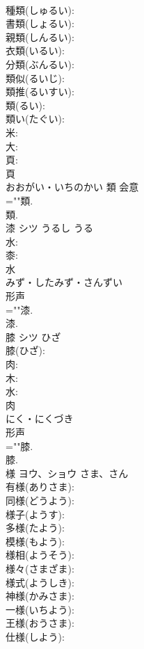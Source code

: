 \documentclass[8pt]{extreport}
\begin{document}
\begin{CJK}{UTF8}{min}
\\	種類(しゅるい): 
\\	書類(しょるい): 
\\	親類(しんるい): 
\\	衣類(いるい): 
\\	分類(ぶんるい): 
\\	類似(るいじ): 
\\	類推(るいすい): 
\\	類(るい): 
\\	類い(たぐい): 
\\	米: 
\\	大: 
\\	頁: 
\\	頁	
\\	おおがい・いちのかい	類	会意 
\\	=""類.
\\	類.
\\	漆	シツ	うるし	うる	
\\	水: 
\\	桼: 
\\	水	
\\	みず・したみず・さんずい	
\\	形声 
\\	=""漆.
\\	漆.
\\	膝	シツ	ひざ		
\\	膝(ひざ): 
\\	肉: 
\\	木: 
\\	水: 
\\	肉	
\\	にく・にくづき	
\\	形声 
\\	=""膝.
\\	膝.
\\	様	ヨウ、ショウ	さま、さん		
\\	有様(ありさま): 
\\	同様(どうよう): 
\\	様子(ようす): 
\\	多様(たよう): 
\\	模様(もよう): 
\\	様相(ようそう): 
\\	様々(さまざま): 
\\	様式(ようしき): 
\\	神様(かみさま): 
\\	一様(いちよう): 
\\	王様(おうさま): 
\\	仕様(しよう): 

\end{CJK}
\end{document}
